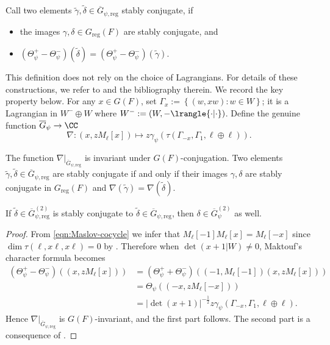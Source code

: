 \documentclass[a4paper,10pt]{article}
\begin{document}
\begin{definition}[J. Adams]\label{def:Adams-conj}
	Call two elements $\tilde{\gamma}, \tilde{\delta} \in \overline{G}_{\psi, \mathrm{reg}}$ stably conjugate, if
	\begin{itemize}
		\item the images $\gamma, \delta \in G_{\mathrm{reg}}(F)$ are stably conjugate, and
		\item $(\Theta^+_\psi - \Theta^-_\psi)(\tilde{\delta}) = (\Theta^+_\psi - \Theta^-_\psi)(\tilde{\gamma})$.
	\end{itemize}
\end{definition}
This definition does not rely on the choice of Lagrangians. For details of these constructions, we refer to \cite{Li11} and the bibliography therein. We record the key property below. For any $x \in G(F)$, set $\Gamma_x := \left\{ (w, xw) : w \in W \right\}$; it is a Lagrangian in $W^- \oplus W$ where $W^- := (W, -\lrangle{\cdot|\cdot})$. Define the genuine function $\overline{G}_\psi \to \CC$ 
\begin{equation}\label{eqn:nabla}
	\nabla: (x, zM_\ell[x]) \mapsto z \gamma_\psi\left( \tau(\Gamma_{-x}, \Gamma_1, \ell \oplus \ell) \right).
\end{equation}

\begin{theorem}\label{prop:nabla}
	The function $\nabla|_{\overline{G}_{\psi, \mathrm{reg}}}$ is invariant under $G(F)$-conjugation. Two elements $\tilde{\gamma}, \tilde{\delta} \in \overline{G}_{\psi, \mathrm{reg}}$ are stably conjugate if and only if their images $\gamma, \delta$ are stably conjugate in $G_{\mathrm{reg}}(F)$ and $\nabla(\tilde{\gamma}) = \nabla(\tilde{\delta})$.
	
	If $\tilde{\delta} \in \overline{G}_{\psi, \mathrm{reg}}^{(2)}$ is stably conjugate to $\tilde{\delta} \in \overline{G}_{\psi, \mathrm{reg}}$, then $\delta \in \overline{G}_\psi^{(2)}$ as well.
\end{theorem}
\begin{proof}
	From \eqref{eqn:Maslov-cocycle} we infer that $M_\ell[-1] M_\ell[x] = M_\ell[-x]$ since $\dim \tau(\ell, x\ell, x\ell) = 0$ by \cite[Proposition 2.5]{Li11}. Therefore when $\det(x+1|W) \neq 0$, Maktouf's character formula \cite[Corollaire 4.4]{Li11} becomes
	\begin{align*}
		\left(\Theta^+_\psi - \Theta^-_\psi\right) \left( (x, zM_\ell[x]) \right) & = \left(\Theta^+_\psi + \Theta^-_\psi\right)\left( (-1, M_\ell[-1]) (x, z M_\ell[x]) \right) \\
		& = \Theta_\psi\left( (-x, z M_\ell[-x]) \right) \\
		& = |\det(x+1)|^{-\frac{1}{2}} z \gamma_\psi\left( \Gamma_{-x}, \Gamma_1, \ell \oplus \ell \right).
	\end{align*}
	Hence $\nabla|_{\overline{G}_{\psi, \mathrm{reg}}}$ is $G(F)$-invariant, and the first part follows. The second part is a consequence of \cite[Théorème 4.2 (iii)]{Li11}.
\end{proof}
\end{document}
